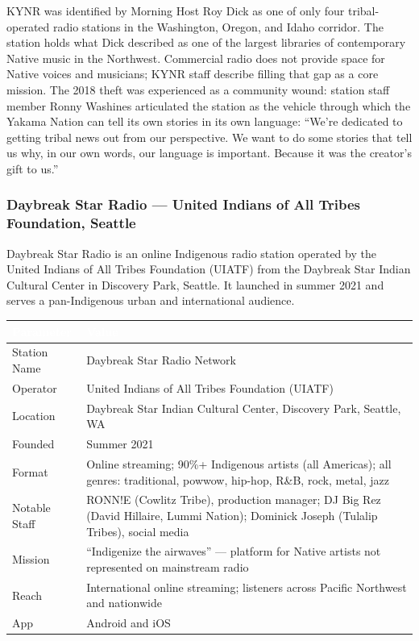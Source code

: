 \documentclass[11pt,letterpaper]{article}
\newcommand{\tableheader}[1]{\textbf{\sffamily\textcolor{white}{#1}}}
\begin{document}
KYNR was identified by Morning Host Roy Dick as one of only four tribal-operated radio stations in the Washington, Oregon, and Idaho corridor. The station holds what Dick described as one of the largest libraries of contemporary Native music in the Northwest. Commercial radio does not provide space for Native voices and musicians; KYNR staff describe filling that gap as a core mission. The 2018 theft was experienced as a community wound: station staff member Ronny Washines articulated the station as the vehicle through which the Yakama Nation can tell its own stories in its own language: ``We're dedicated to getting tribal news out from our perspective. We want to do some stories that tell us why, in our own words, our language is important. Because it was the creator's gift to us.''

\subsubsection{Daybreak Star Radio --- United Indians of All Tribes Foundation, Seattle}

Daybreak Star Radio is an online Indigenous radio station operated by the United Indians of All Tribes Foundation (UIATF) from the Daybreak Star Indian Cultural Center in Discovery Park, Seattle. It launched in summer 2021 and serves a pan-Indigenous urban and international audience.

\begin{center}
\begin{tabularx}{\textwidth}{L{3.5cm}X}
\toprule
{}
\tableheader{Parameter} & \tableheader{Value} \\
\midrule
Station Name & Daybreak Star Radio Network \\
Operator & United Indians of All Tribes Foundation (UIATF) \\
Location & Daybreak Star Indian Cultural Center, Discovery Park, Seattle, WA \\
Founded & Summer 2021 \\
Format & Online streaming; 90\%+ Indigenous artists (all Americas); all genres: traditional, powwow, hip-hop, R\&B, rock, metal, jazz \\
Notable Staff & RONN!E (Cowlitz Tribe), production manager; DJ Big Rez (David Hillaire, Lummi Nation); Dominick Joseph (Tulalip Tribes), social media \\
Mission & ``Indigenize the airwaves'' --- platform for Native artists not represented on mainstream radio \\
Reach & International online streaming; listeners across Pacific Northwest and nationwide \\
App & Android and iOS \\
\bottomrule
\end{tabularx}
\end{center}
\end{document}
